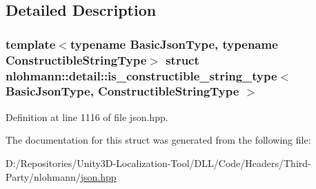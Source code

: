 \subsection{Detailed Description}
\subsubsection*{template$<$typename Basic\+Json\+Type, typename Constructible\+String\+Type$>$\newline
struct nlohmann\+::detail\+::is\+\_\+constructible\+\_\+string\+\_\+type$<$ Basic\+Json\+Type, Constructible\+String\+Type $>$}



Definition at line 1116 of file json.\+hpp.



The documentation for this struct was generated from the following file\+:\begin{DoxyCompactItemize}
\item 
D\+:/\+Repositories/\+Unity3\+D-\/\+Localization-\/\+Tool/\+D\+L\+L/\+Code/\+Headers/\+Third-\/\+Party/nlohmann/\mbox{\hyperlink{json_8hpp}{json.\+hpp}}\end{DoxyCompactItemize}
